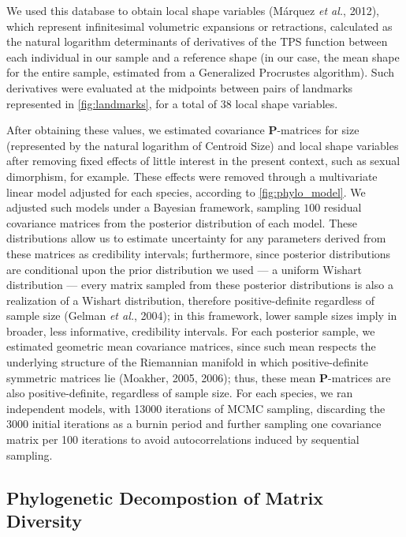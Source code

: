 \documentclass[12pt,twoside]{report}
\begin{document}
We used this database to obtain local shape variables (Márquez \emph{et
al.}, 2012), which represent infinitesimal volumetric expansions or
retractions, calculated as the natural logarithm determinants of
derivatives of the TPS function between each individual in our sample
and a reference shape (in our case, the mean shape for the entire
sample, estimated from a Generalized Procrustes algorithm). Such
derivatives were evaluated at the midpoints between pairs of landmarks
represented in \autoref{fig:landmarks}, for a total of 38 local shape
variables.

After obtaining these values, we estimated covariance
$\mathbf{P}$-matrices for size (represented by the natural logarithm of
Centroid Size) and local shape variables after removing fixed effects of
little interest in the present context, such as sexual dimorphism, for
example. These effects were removed through a multivariate linear model
adjusted for each species, according to \autoref{fig:phylo_model}. We
adjusted such models under a Bayesian framework, sampling $100$ residual
covariance matrices from the posterior distribution of each model. These
distributions allow us to estimate uncertainty for any parameters
derived from these matrices as credibility intervals; furthermore, since
posterior distributions are conditional upon the prior distribution we
used --- a uniform Wishart distribution --- every matrix sampled from
these posterior distributions is also a realization of a Wishart
distribution, therefore positive-definite regardless of sample size
(Gelman \emph{et al.}, 2004); in this framework, lower sample sizes
imply in broader, less informative, credibility intervals. For each
posterior sample, we estimated geometric mean covariance matrices, since
such mean respects the underlying structure of the Riemannian manifold
in which positive-definite symmetric matrices lie (Moakher, 2005, 2006);
thus, these mean $\mathbf{P}$-matrices are also positive-definite,
regardless of sample size. For each species, we ran independent models,
with 13000 iterations of MCMC sampling, discarding the 3000 initial
iterations as a burnin period and further sampling one covariance matrix
per 100 iterations to avoid autocorrelations induced by sequential
sampling.

\subsection{Phylogenetic Decompostion of Matrix
Diversity}\label{phylogenetic-decompostion-of-matrix-diversity}
\end{document}
